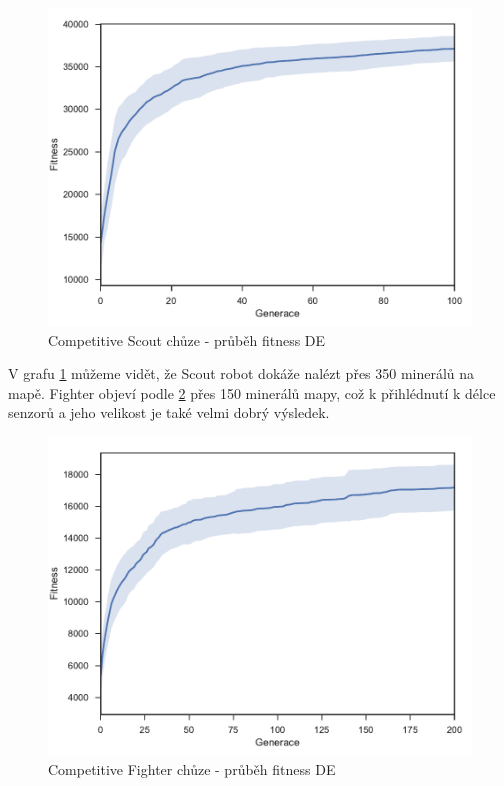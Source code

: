 \begin{figure}[t]\centering
	\includegraphics[width=0.7\columnwidth]{../img/CompetitiveMap/ScoutWalk}
	\caption{Competitive Scout chůze - průběh fitness DE}
	\label{obr04:CompetitiveScoutWalk}
\end{figure}
V grafu \ref{obr04:CompetitiveScoutWalk} můžeme vidět, že Scout robot dokáže nalézt přes 350 minerálů na mapě. Fighter objeví podle \ref{obr04:CompetitiveFighterWalk}  přes 150 minerálů mapy, což k přihlédnutí k délce senzorů a jeho velikost je také velmi dobrý výsledek.  
\begin{figure}[h]\centering
	\includegraphics[width=0.7\columnwidth]{../img/CompetitiveMap/FighterWalk}
	\caption{Competitive Fighter chůze - průběh fitness DE}
	\label{obr04:CompetitiveFighterWalk}
\end{figure}
\clearpage
